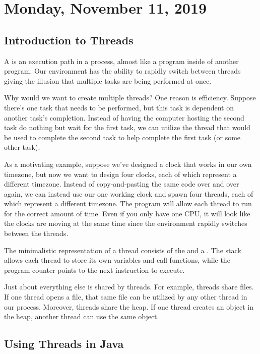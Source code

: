 \section{Monday, November 11, 2019}

\subsection{Introduction to Threads}

A  is an execution path in a process, almost like a program inside of another program. Our environment has the ability to rapidly switch between threads giving the illusion that multiple tasks are being performed at once.

Why would we want to create multiple threads? One reason is efficiency. Suppose there's one task that needs to be performed, but this task is dependent on another task's completion. Instead of having the computer hosting the second task do nothing but wait for the first task, we can utilize the thread that would be used to complete the second task to help complete the first task (or some other task). 

As a motivating example, suppose we've designed a clock that works in our own timezone, but now we want to design four clocks, each of which represent a different timezone. Instead of copy-and-pasting the same code over and over again, we can instead use our one working clock and spawn four threads, each of which represent a different timezone. The program will allow each thread to run for the correct amount of time. Even if you only have one CPU, it will look like the clocks are moving at the same time since the environment rapidly switches between the threads. 


The minimalistic representation of a thread consists of the  and a . The stack allows each thread to store its own variables and call functions, while the program counter points to the next instruction to execute. 


Just about everything else is shared by threads. For example, threads share files. If one thread opens a file, that same file can be utilized by any other thread in our process. Moreover, threads share the heap. If one thread creates an object in the heap, another thread can use the same object. 

\subsection{Using Threads in Java}

